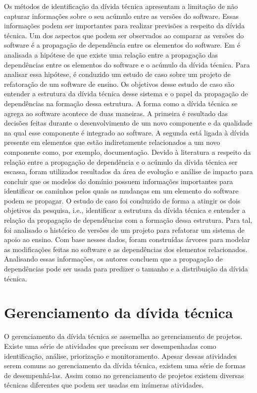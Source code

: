 Os métodos de identificação da dívida técnica apresentam a limitação de não capturar informações sobre o seu acúmulo entre as versões do software. Essas informações podem ser importantes para realizar previsões a respeito da dívida técnica. Um dos aspectos que podem ser observados ao comparar as versões do software é a propagação de dependência entre os elementos do software. Em \cite{inpHoLaRaKaLe13a} é analisada a hipótese de que existe uma relação entre a propagação das dependências entre  os  elementos do software e o acúmulo da dívida técnica. Para analisar essa hipótese, é conduzido um estudo de caso sobre um projeto de refatoração de um software de ensino. Os objetivos desse estudo de caso são entender a estrutura da dívida técnica desse sistema e o papel da propagação de dependências na formação dessa estrutura. A forma como a dívida técnica se agrega ao software acontece de duas maneiras. A primeira é resultado das decisões feitas durante o desenvolvimento de um novo componente e da qualidade na qual esse componente é integrado ao software. A segunda está ligada à dívida presente em elementos que estão indiretamente relacionados a um novo componente como, por exemplo, documentação. Devido à literatura a respeito da relação entre a propagação de dependência e o acúmulo da dívida técnica ser escassa, foram utilizados resultados da área de evolução e análise de impacto para concluir que os modelos do domínio possuem informações importantes para identificar os caminhos pelos quais as mudanças em um elemento do software podem se propagar.  O estudo de caso foi conduzido de forma a atingir os dois objetivos da pesquisa, i.e., identificar a estrutura da dívida técnica e entender a relação da propagação de dependências com a formação dessa estrutura. Para tal, foi analisado o histórico de versões de um projeto para refatorar um sistema de apoio ao ensino. Com base nesses dados, foram construídas árvores para modelar as modificações feitas no software e as dependências dos elementos relacionados. Analisando essas informações, os autores concluem que a propagação de dependências pode ser usada para predizer o tamanho e a distribuição da dívida técnica.



\section{Gerenciamento da dívida técnica}

O gerenciamento da dívida técnica se assemelha ao gerenciamento de projetos. Existe uma série de atividades que precisam ser desempenhadas como identificação, análise, priorização e monitoramento. Apesar dessas atividades serem comuns ao gerenciamento da dívida técnica, existem uma série de formas de desempenhá-las. Assim como no gerenciamento de projetos existem diversas técnicas diferentes que podem ser usadas em inúmeras atividades.

